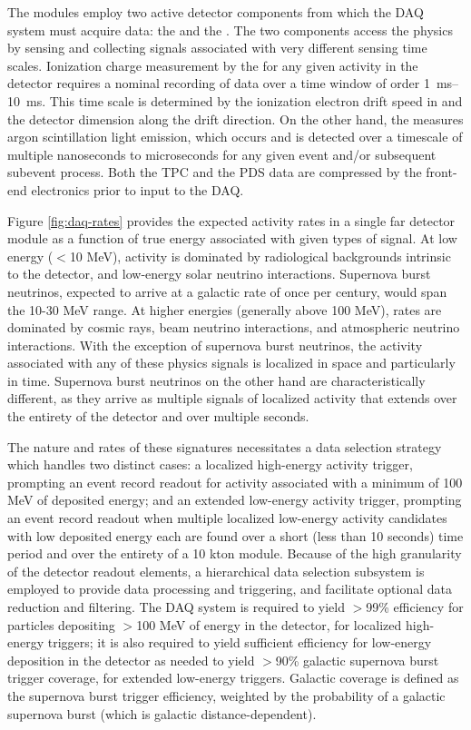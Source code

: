 The   modules employ two active detector components from
which the DAQ system must acquire data: the  and the
. The two components access the physics %
by sensing and collecting signals associated with very different sensing time
scales.
Ionization charge measurement by the  for any given activity in the
detector requires a nominal recording of data over a time window of order
\SIrange{1}{10}{\milli\second}. 
This time scale is determined by the ionization electron drift speed in \lar and
the detector dimension along the drift direction. 
On the other hand, the  measures argon scintillation light emission,
which occurs and is detected over a timescale of multiple nanoseconds to
microseconds for any given event and/or subsequent subevent process.
Both the TPC and the PDS data are compressed by the front-end electronics prior
to input to the DAQ.
 
Figure \ref{fig:daq-rates} provides the expected activity rates in a
single far detector module as a function of true energy associated
with given types of signal.
At low energy ($<$10 MeV), activity is dominated by radiological backgrounds
intrinsic to the detector, and
low-energy solar neutrino interactions. Supernova burst neutrinos,
expected to arrive at a galactic  rate of once per century, 
would span the 10-30 MeV range. At higher energies (generally
above 100 MeV), rates are dominated by cosmic rays, beam neutrino interactions,
and atmospheric neutrino interactions. With the exception of supernova
burst neutrinos, the activity associated with any of these physics
signals is localized in space and particularly in time. Supernova burst
neutrinos on the other hand are characteristically different, as they arrive as multiple
signals of localized activity that extends over the entirety of the
detector and over multiple seconds.

The nature and rates of these signatures necessitates a data selection strategy
which handles two distinct cases: a localized high-energy activity trigger,
prompting an event record readout for activity associated with a minimum of 100
MeV of deposited energy; and an extended low-energy activity trigger, prompting
an event record readout when multiple localized low-energy activity candidates
with low deposited energy each are found over a short (less than 10 seconds)
time period and over the entirety of a 10 kton module. 
Because of the high granularity of the detector readout elements, a hierarchical
data selection subsystem is employed to provide data processing and triggering,
and facilitate optional data reduction and filtering.
The DAQ system is required to yield $>$99\% efficiency for particles depositing
$>$100 MeV of energy in the detector, for localized high-energy triggers; it is
also required to yield sufficient efficiency for low-energy deposition in the
detector as needed to yield $>$90\% galactic supernova burst trigger coverage,
for extended low-energy triggers.
Galactic coverage is defined as the supernova burst trigger efficiency, weighted
by the probability of a galactic supernova burst (which is galactic
distance-dependent).

